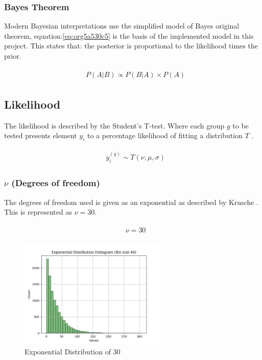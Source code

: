 \documentclass[11pt]{report}
\begin{document}
\subsubsection{Bayes Theorem}
\label{sec:orge588d47}

Modern Bayesian interpretations use the simplified model of Bayes original theorem, equation:\ref{eq:org5a530c5} is the basis of the implemented model in this project. This states that: the posterior is proportional to the likelihood times the prior.

\begin{align}
\label{eq:org5a530c5}
  &\begin{aligned}
  P(A|B) \propto P(B|A) \times P(A)
  \end{aligned}
\end{align}


\subsection{Likelihood}
\label{sec:org2244805}
The likelihood is described by the Student's T-test. Where each group \(g\) to be tested presents element \(y_i\) to a percentage likelihood of fitting a distribution \(T\) .

 \begin{align}
\label{eq:org5a46101}
   &\begin{aligned}
y_i^{(g)} \sim T(\nu, \mu, \sigma)
   \end{aligned}
 \end{align}

\subsubsection{\(\nu\) (Degrees of freedom)}
\label{sec:orga926ebf}
The degrees of freedom used is given as an exponential as described by
Krusche \cite{Kruschke2012}. This is represented as \(\nu = 30\).

 \begin{align}
\label{eq:orgb8ae625}
   &\begin{aligned}
\nu = 30
   \end{aligned}
 \end{align}

\begin{figure}[htbp]
\centering
\includegraphics[width=7cm]{./images/dist2.png}
\caption{\label{fig:orgaf5637e}
Exponential Distribution of 30}
\end{figure}
\end{document}
